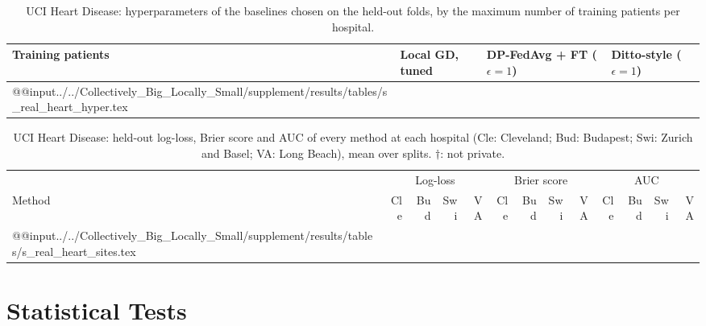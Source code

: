 \documentclass[acmsmall,screen,nonacm]{acmart}
\theoremstyle{acmdefinition}
\begin{document}
\begin{table}[t]
\caption{UCI Heart Disease: hyperparameters of the baselines chosen on the held-out folds, by the maximum number of training patients per hospital.}
\label{tab:real-hyper}
\footnotesize
\begin{tabular}{@{}llll@{}}
\toprule
Training patients & Local GD, tuned & DP-FedAvg \cite{mcmahan2018learning} + FT ($\epsilon=1$) & Ditto-style \cite{li2021ditto} ($\epsilon=1$)\\
\midrule
\csname @@input\endcsname../../Collectively_Big_Locally_Small/supplement/results/tables/s_real_heart_hyper.tex 
\bottomrule
\end{tabular}
\end{table}

\begin{table}[t]
\caption{UCI Heart Disease: held-out log-loss, Brier score and AUC of every method at each hospital (Cle: Cleveland; Bud: Budapest; Swi: Zurich and Basel; VA: Long Beach), mean over \SimRealHeartSplits{} splits. $\dagger$: not private.}
\label{tab:real-sites}
\scriptsize
\setlength{\tabcolsep}{2.6pt}
\begin{tabular}{@{}lrrrrrrrrrrrr@{}}
\toprule
 & \multicolumn{4}{c}{Log-loss} & \multicolumn{4}{c}{Brier score} & \multicolumn{4}{c}{AUC}\\
\cmidrule(lr){2-5}\cmidrule(lr){6-9}\cmidrule(l){10-13}
Method & Cle & Bud & Swi & VA & Cle & Bud & Swi & VA & Cle & Bud & Swi & VA\\
\midrule
\csname @@input\endcsname../../Collectively_Big_Locally_Small/supplement/results/tables/s_real_heart_sites.tex 
\bottomrule
\end{tabular}
\end{table}

\section{Statistical Tests}\label{sec:stats}
\end{document}
